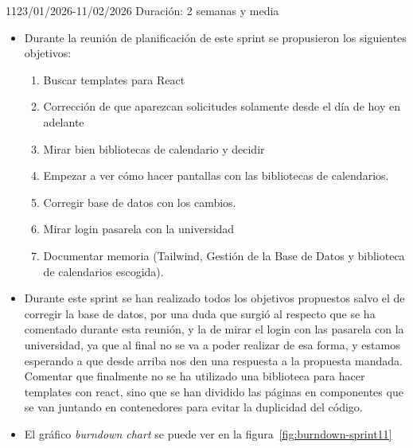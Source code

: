 \begin{Sprint}{11}{23/01/2026-11/02/2026}
	Duración: 2 semanas y media
	\begin{itemize}	
		\item{}
		Durante la reunión de planificación de este sprint se propusieron los siguientes objetivos:
		\begin{enumerate}
			\item Buscar templates para React
			\item Corrección de que aparezcan solicitudes solamente desde el día de hoy en adelante
			\item Mirar bien bibliotecas de calendario y decidir
			\item Empezar a ver cómo hacer pantallas con las bibliotecas de calendarios.
			\item Corregir base de datos con los cambios.
			\item Mirar login pasarela con la universidad
			\item Documentar memoria (Tailwind, Gestión de la Base de Datos y biblioteca de calendarios escogida).
		\end{enumerate}
		\item{}
		Durante este sprint se han realizado todos los objetivos propuestos salvo el de corregir la base de datos, por una duda que surgió al respecto que se ha comentado durante esta reunión, y la de mirar el login con las pasarela con la universidad, ya que al final no se va a poder realizar de esa forma, y estamos esperando a que desde arriba nos den una respuesta a la propuesta mandada. Comentar que finalmente no se ha utilizado una biblioteca para hacer templates con react, sino que se han dividido las páginas en componentes que se van juntando en contenedores para evitar la duplicidad del código.	
		\item{}
		El gráfico \textit{burndown chart} se puede ver en la figura~\ref{fig:burndown-sprint11}
	\end{itemize}
\end{Sprint}

